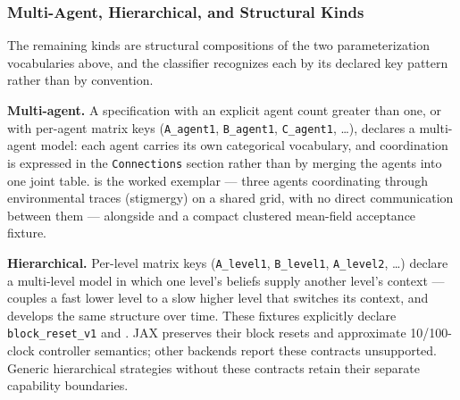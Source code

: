 \documentclass[
  english,
  9pt,
]{extarticle}
\begin{document}
\subsubsection{Multi-Agent, Hierarchical, and Structural
Kinds}\label{sec:structural_variants}

The remaining kinds are structural compositions of the two
parameterization vocabularies above, and the classifier recognizes each
by its declared key pattern rather than by convention.

\textbf{Multi-agent.} A specification with an explicit agent count
greater than one, or with per-agent matrix keys (\texttt{A\_agent1},
\texttt{B\_agent1}, \texttt{C\_agent1}, \ldots), declares a multi-agent
model: each agent carries its own categorical vocabulary, and
coordination is expressed in the \texttt{Connections} section rather
than by merging the agents into one joint table.
 is the worked
exemplar --- three agents coordinating through environmental traces
(stigmergy) on a shared grid, with no direct communication between them
--- alongside  and a compact
clustered mean-field acceptance fixture.

\textbf{Hierarchical.} Per-level matrix keys (\texttt{A\_level1},
\texttt{B\_level1}, \texttt{A\_level2}, \ldots) declare a multi-level
model in which one level's beliefs supply another level's context ---
 couples a
fast lower level to a slow higher level that switches its context, and
 develops the same structure over time.
These fixtures explicitly declare \texttt{block\_reset\_v1} and
. JAX preserves their block resets
and approximate 10/100-clock controller semantics; other backends report
these contracts unsupported. Generic hierarchical strategies without
these contracts retain their separate capability boundaries.
\end{document}
